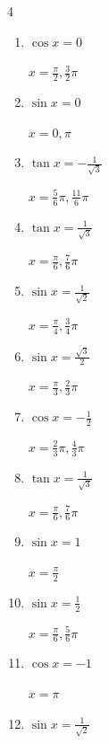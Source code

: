 \begin{multicols}{4}
\begin{enumerate}
  \item $\displaystyle \cos{x}  = 0$

        $\displaystyle x = \frac{\pi}{2} , \frac{3}{2}\pi$

  \item $\displaystyle \sin{x}  = 0$

        $\displaystyle x = 0 , \pi$

  \item $\displaystyle \tan{x}  = -\frac{1}{\sqrt{3}}$

        $\displaystyle x = \frac{5}{6}\pi , \frac{11}{6}\pi$

  \item $\displaystyle \tan{x}  = \frac{1}{\sqrt{3}}$

        $\displaystyle x = \frac{\pi}{6} , \frac{7}{6}\pi$

  \item $\displaystyle \sin{x}  = \frac{1}{\sqrt{2}}$

        $\displaystyle x = \frac{\pi}{4} , \frac{3}{4}\pi$

  \item $\displaystyle \sin{x}  = \frac{\sqrt{3}}{2}$

        $\displaystyle x = \frac{\pi}{3} , \frac{2}{3}\pi$

  \item $\displaystyle \cos{x}  = -\frac{1}{2}$

        $\displaystyle x = \frac{2}{3}\pi , \frac{4}{3}\pi$

  \item $\displaystyle \tan{x}  = \frac{1}{\sqrt{3}}$

        $\displaystyle x = \frac{\pi}{6} , \frac{7}{6}\pi$

  \item $\displaystyle \sin{x}  = 1$

        $\displaystyle x = \frac{\pi}{2}$

\columnbreak %

\resetques

  \item $\displaystyle \sin{x}  = \frac{1}{2}$

        $\displaystyle x = \frac{\pi}{6} , \frac{5}{6}\pi$

  \item $\displaystyle \cos{x}  = -1$

        $\displaystyle x = \pi$

  \item $\displaystyle \sin{x}  = \frac{1}{\sqrt{2}}$


\end{enumerate}
\end{multicols}
